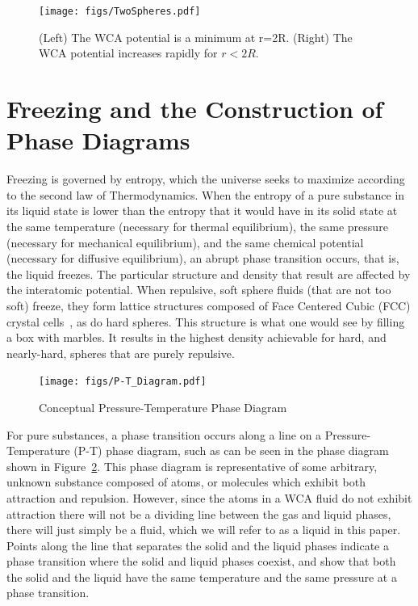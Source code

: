 \documentclass[double,12pt]{beavtex}
\begin{document}
\begin{figure}
    \centering
    \texttt{[image: figs/TwoSpheres.pdf]} 
    \caption{(Left) The WCA potential is a minimum at r=2R. 
             (Right) The WCA potential increases rapidly for $r<2R$.}
    \label{fig:TwoSpheres}
\end{figure} 
    
\section{Freezing and the Construction of Phase Diagrams}

Freezing is governed by entropy, which the universe %
seeks to maximize according to the second law of Thermodynamics. When the 
entropy of a pure substance in its liquid state is lower than the entropy 
that it would have in its solid state at the same temperature (necessary 
for thermal equilibrium), the same pressure (necessary for mechanical 
equilibrium), and the same chemical potential (necessary for diffusive 
equilibrium), an abrupt phase transition occurs, that is, the liquid 
freezes. The particular structure and density that result are affected 
by the interatomic potential. When repulsive, soft sphere fluids 
(that are not too soft) freeze, they form lattice structures composed of 
Face Centered Cubic (FCC) crystal cells~\cite{Hansen}, as do hard spheres. 
This structure is what one would see by filling a box with marbles. It 
results in the highest density achievable for hard, and nearly-hard, spheres 
that are purely repulsive. 

\begin{figure}
    \centering
    \texttt{[image: figs/P-T\_Diagram.pdf]}
    \caption{Conceptual Pressure-Temperature Phase Diagram}
    \label{fig:P-T_Diagram}
\end{figure}

For pure substances, a phase transition occurs along a line on a 
Pressure-Temperature (P-T) phase diagram, such as can be seen in the phase 
diagram shown in Figure~\ref{fig:P-T_Diagram}. This phase diagram is 
representative of some arbitrary, unknown substance composed of atoms, 
or molecules which exhibit both attraction and repulsion. However, since 
the atoms in a WCA fluid do not exhibit attraction there will not be a 
dividing line between the gas and liquid phases, there will just simply
be a fluid, which we will refer to as a liquid in this paper.
Points along the line that separates the solid and the liquid phases 
indicate a phase transition where the solid and liquid phases coexist, 
and show that both the solid and the liquid have the same temperature 
and the same pressure at a phase transition.
\end{document}
